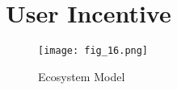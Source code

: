 \chapter{User Incentive}
\label{chap:appD}
\begin{figure}[htbp]
\centering
	  \texttt{[image: fig\_16.png]}
    \caption{Ecosystem Model}
 \label{fig_16}
\end{figure}
